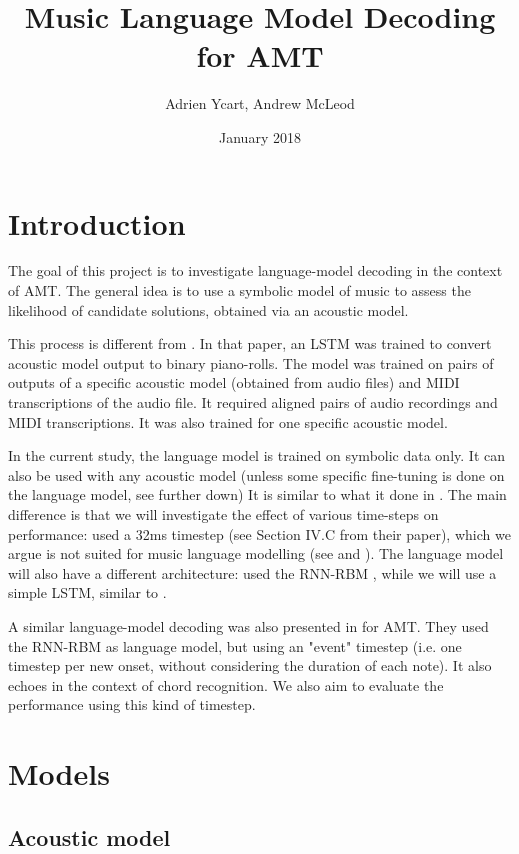 \documentclass{article}
\title{Music Language Model Decoding for AMT}
\author{Adrien Ycart, Andrew McLeod}
\date{January 2018}
\begin{document}
\maketitle

\section{Introduction}

The goal of this project is to investigate language-model decoding in the context of AMT.
The general idea is to use a symbolic model of music to assess the likelihood of candidate solutions, obtained via an acoustic model.

This process is different from \cite{ycart2018polyphonic}.
In that paper, an LSTM was trained to convert acoustic model output to binary piano-rolls.
The model was trained on pairs of outputs of a specific acoustic model (obtained from audio files) and MIDI transcriptions of the audio file.
It required aligned pairs of audio recordings and MIDI transcriptions.
It was also trained for one specific acoustic model.

In the current study, the language model is trained on symbolic data only.
It can also be used with any acoustic model (unless some specific fine-tuning is done on the language model, see further down)
It is similar to what it done in \cite{sigtia2016end}.
The main difference is that we will investigate the effect of various time-steps on performance:
 \cite{sigtia2016end} used a 32ms timestep (see Section IV.C from their paper), which we argue is not suited for music language modelling (see \cite{Ycart2017} and \cite{Korzeniowski2017}).
The language model will also have a different architecture: 
\cite{sigtia2016end} used the RNN-RBM \cite{Boulanger-Lewandowski2012}, while we will use a simple LSTM, similar to \cite{Ycart2017}.

A similar language-model decoding was also presented in \cite{app8030470} for AMT.
They used the RNN-RBM as language model, but using an "event" timestep (i.e. one timestep per new onset, without considering the duration of each note).
It also echoes \cite{Korzeniowski2018} in the context of chord recognition.
We also aim to evaluate the performance using this kind of timestep.

\section{Models}

\subsection{Acoustic model}
\end{document}
